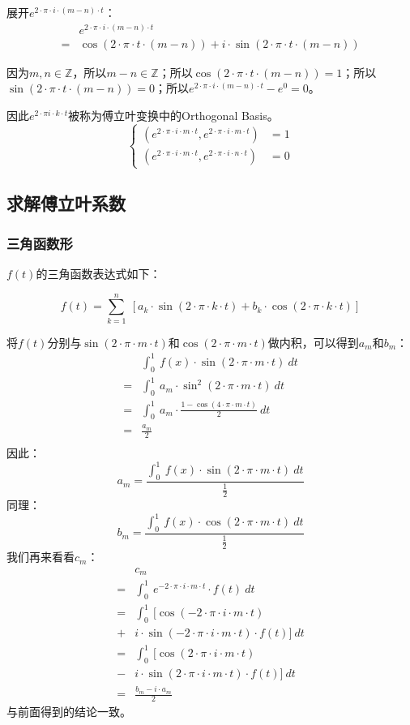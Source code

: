 展开$e^{2\cdot \pi\cdot i\cdot (m-n)\cdot t}$：
\begin{align*}
	  & e^{2\cdot \pi\cdot i\cdot (m-n)\cdot t}                                       \\
	= & \cos(2\cdot \pi \cdot t\cdot(m-n))+i \cdot \sin(2\cdot \pi \cdot t\cdot(m-n))
\end{align*}

因为$m,n\in \mathbb{Z}$，所以$m-n\in \mathbb{Z}$；所以$\cos(2\cdot \pi \cdot t\cdot(m-n))=1$；所以$\sin(2\cdot \pi \cdot t\cdot(m-n))=0$；所以$e^{2\cdot \pi\cdot i\cdot (m-n)\cdot t}-e^0=0$。

因此$e^{2\cdot \pi i\cdot k \cdot t}$被称为傅立叶变换中的Orthogonal Basis。
$$
	\begin{cases}
		(e^{2\cdot \pi\cdot i\cdot m\cdot t},e^{2\cdot \pi\cdot i\cdot m\cdot t}) & =1 \\
		(e^{2\cdot \pi\cdot i\cdot m\cdot t},e^{2\cdot \pi\cdot i\cdot n\cdot t}) & =0
	\end{cases}
$$
\subsection{求解傅立叶系数}
\subsubsection{三角函数形}
$f(t)$的三角函数表达式如下：

$$f(t)=\sum\limits_{k=1}^n\ [a_k\cdot \sin(2\cdot\pi\cdot k\cdot t) +b_k\cdot \cos(2\cdot \pi\cdot k\cdot t)]$$

将$f(t)$分别与$\sin(2\cdot \pi\cdot m \cdot t)$和$\cos(2\cdot \pi\cdot m \cdot t)$做内积，可以得到$a_m$和$b_m$：
\begin{align*}
	  & \int_0^1\ f(x)\cdot \sin(2\cdot \pi\cdot m \cdot t)\ dt            \\
	= & \int_0^1\ a_m\cdot \sin^2(2\cdot \pi\cdot m \cdot t)\ dt           \\
	= & \int_0^1\ a_m\cdot \frac{1-\cos(4\cdot \pi\cdot m \cdot t)}{2}\ dt \\
	= & \frac{a_m}{2}                                                      \\
\end{align*}
因此：
$$
	a_m=\frac{\int_0^1\ f(x)\cdot \sin(2\cdot \pi\cdot m \cdot t)\ dt}{\frac{1}{2}}
$$
同理：
$$
	b_m=\frac{\int_0^1\ f(x)\cdot \cos(2\cdot \pi\cdot m \cdot t)\ dt}{\frac{1}{2}}
$$
我们再来看看$c_m$：
\begin{align*}
	  & c_m                                                           \\
	= & \int_0^1 \ e^{-2\cdot \pi\cdot i\cdot m\cdot t}\cdot f(t)\ dt \\
	= & \int_0^1 \ [\cos(-2\cdot \pi\cdot i\cdot m\cdot t)            \\
	+ & i\cdot \sin(-2\cdot \pi\cdot i\cdot m\cdot t)\cdot f(t)]\ dt  \\
	= & \int_0^1 \ [\cos(2\cdot \pi\cdot i\cdot m\cdot t)             \\
	- & i\cdot \sin(2\cdot \pi\cdot i\cdot m\cdot t)\cdot f(t)]\ dt   \\
	= & \frac{b_m-i\cdot a_m}{2}
\end{align*}
与前面得到的结论一致。
